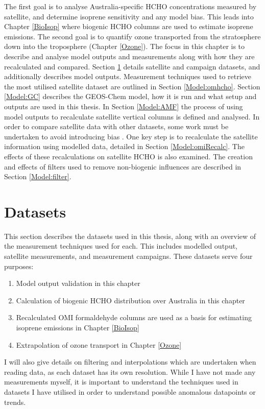   The first goal is to analyse Australia-specific HCHO concentrations measured by satellite, and determine isoprene sensitivity and any model bias.
  This leads into Chapter \ref{BioIsop} where biogenic HCHO columns are used to estimate isoprene emissions.
  The second goal is to quantify ozone transported from the stratosphere down into the troposphere (Chapter \ref{Ozone}).
  The focus in this chapter is to describe and analyse model outputs and measurements along with how they are recalculated and compared.
  Section \ref{Model:datasets} details satellite and campaign datasets, and additionally describes model outputs.
  Measurement techniques used to retrieve the most utilised satellite dataset are outlined in Section \ref{Model:omhcho}.
  Section \ref{Model:GC} describes the GEOS-Chem model, how it is run and what setup and outputs are used in this thesis.
  In Section \ref{Model:AMF} the process of using model outputs to recalculate satellite vertical columns is defined and analysed.
  In order to compare satellite data with other datasets, some work must be undertaken to avoid introducing bias \parencite[e.g.,][]{Palmer2001, Eskes2003, Marais2012, Lamsal2014}.
  One key step is to recalculate the satellite information using modelled data, detailed in Section \ref{Model:omiRecalc}.
  The effects of these recalculations on satellite HCHO is also examined.
  The creation and effects of filters used to remove non-biogenic influences are described in Section \ref{Model:filter}.
  
  

\section{Datasets}
  \label{Model:datasets}
  
  This section describes the datasets used in this thesis, along with an overview of the measurement techniques used for each.
  This includes modelled output, satellite measurements, and measurement campaigns.
  These datasets serve four purposes: 
  \begin{enumerate}
    \item Model output validation in this chapter
    \item Calculation of biogenic HCHO distribution over Australia in this chapter
    \item Recalculated OMI formaldehyde columns are used as a basis for estimating isoprene emissions in Chapter \ref{BioIsop}
    \item Extrapolation of ozone transport in Chapter \ref{Ozone}
  \end{enumerate}
  I will also give details on filtering and interpolations which are undertaken when reading data, as each dataset has its own resolution.
  While I have not made any measurements myself, it is important to understand the techniques used in datasets I have utilised in order to understand possible anomalous datapoints or trends.
  
